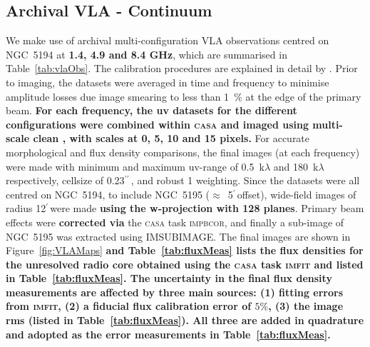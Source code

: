 \documentclass[fleqn,usenatbib]{mnras}
\def\fig{Figure}
\def\tab{Table}
\def\Tab{Table}
\def\arcm{$^{\prime}\,$}
\def\arcs{$^{\prime\prime}\,$}
\begin{document}
\subsection{Archival VLA - Continuum} 
\label{sec:vla_cont}
We make use of archival multi-configuration VLA observations centred on NGC~5194 at \textbf{1.4, 4.9 and 8.4 GHz}, which 
are summarised in \Tab~\ref{tab:vlaObs}. The calibration procedures are explained in detail by 
\cite{Dumasetal2011}. Prior to imaging, the datasets were averaged in time and frequency to minimise 
amplitude losses due image smearing to less than 1~$\%$ at the edge of the primary beam. \textbf{For 
each frequency, the uv datasets for the different configurations were combined within \textsc{casa} 
and imaged using multi-scale clean \citep{RC2011}, with scales at 0, 5, 10 and 15 pixels. }For 
accurate morphological and flux density comparisons, the final images (at each frequency) were made 
with minimum and maximum uv-range of 0.5~k$\lambda$ and 180~k$\lambda$ respectively, cellsize of 
0.23\arcs, and robust 1 weighting. Since the datasets were all centred on NGC~5194, to include 
NGC~5195 ($\approx$~5\arcm offset), wide-field images of radius 12\arcm were made \textbf{using the 
w-projection \citep{wproj} with 128 planes}.  Primary beam effects were \textbf{corrected via} the 
\textsc{casa} task \textsc{impbcor}, and finally a sub-image of NGC~5195 was extracted using 
IMSUBIMAGE. The final images are shown in \fig~\ref{fig:VLAMaps} \textbf{and \tab~\ref{tab:fluxMeas} 
lists the flux densities for the unresolved radio core obtained using the \textsc{casa} task 
\textsc{imfit} and listed in \tab~\ref{tab:fluxMeas}. The uncertainty in the final flux density 
measurements are affected by three main sources: (1) fitting errors from \textsc{imfit}, (2) a 
fiducial flux calibration error of $5\%$, (3) the image rms (listed in \tab~\ref{tab:fluxMeas}). All 
three are added in quadrature and adopted as the error measurements in \tab~\ref{tab:fluxMeas}.}  
\end{document}
